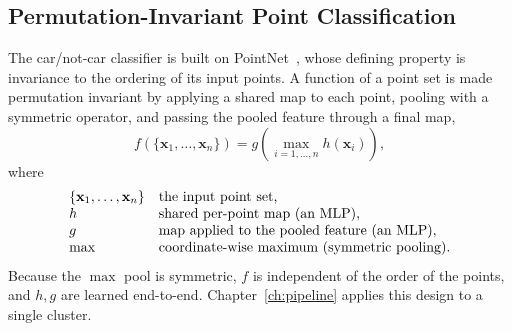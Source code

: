 \subsection{Permutation-Invariant Point Classification}
\label{sec:th-pointnet}
The car/not-car classifier is built on PointNet~\cite{Qi_2017_CVPR}, whose defining property
is invariance to the ordering of its input points. A function of a point set is made
permutation invariant by applying a shared map to each point, pooling with a symmetric
operator, and passing the pooled feature through a final map,
\begin{equation}
  f(\{\mathbf{x}_1,\dots,\mathbf{x}_n\}) = g\!\left( \max_{i=1,\dots,n} h(\mathbf{x}_i) \right),
  \label{eq:pointnet}
\end{equation}
where
\[
  \begin{array}{@{}l@{\quad}l@{}}
    \{\mathbf{x}_1,\dots,\mathbf{x}_n\} & \text{the input point set,}\\
    h & \text{shared per-point map (an MLP),}\\
    g & \text{map applied to the pooled feature (an MLP),}\\
    \max & \text{coordinate-wise maximum (symmetric pooling).}
  \end{array}
\]
Because the $\max$ pool is symmetric, $f$ is independent of the order of the points, and
$h,g$ are learned end-to-end. Chapter~\ref{ch:pipeline} applies this design to a single
cluster.

